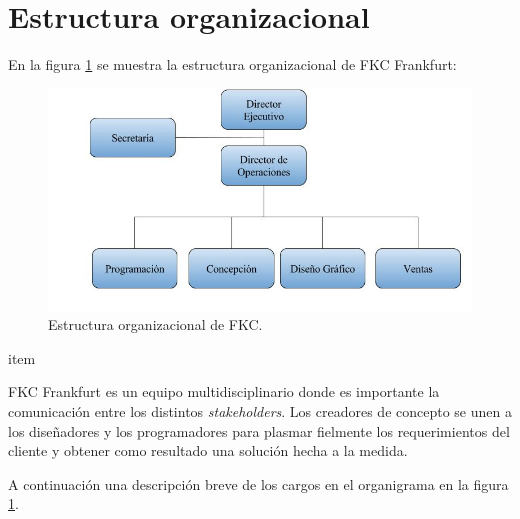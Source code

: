 \section{Estructura organizacional}

En la figura \ref{fig:estructuraFKC} se muestra la estructura organizacional de \gls{FKC} Frankfurt:

\begin{figure}[h]
\begin{center}
	\includegraphics[width=\textwidth]{figuras/estructuraFKC.jpg}
	\caption{Estructura organizacional de \gls{FKC}.} \label{fig:estructuraFKC}
\end{center}
\end{figure}

item

\gls{FKC} Frankfurt es un equipo multidisciplinario donde es importante la comunicación entre los distintos \emph{stakeholders}. Los creadores de concepto se unen a los diseñadores y los programadores para plasmar fielmente los requerimientos del cliente y obtener como resultado una solución hecha a la medida.

A continuación una descripción breve de los cargos en el organigrama en la figura \ref{fig:estructuraFKC}.

